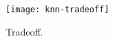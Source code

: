 \begin{figure}[h]
	\centering
	\texttt{[image: knn-tradeoff]} %
	\caption{
		Tradeoff.
	}\label{figure:knn-tradeoff}
\end{figure}
